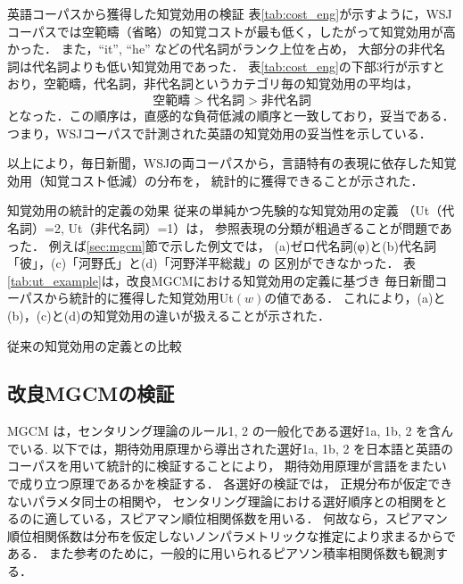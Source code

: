 \documentclass[japanese]{jnlp_1.3e}
\renewcommand{\paragraph}{}
\begin{document}
\paragraph{英語コーパスから獲得した知覚効用の検証}
表\ref{tab:cost_eng}が示すように，WSJコーパスでは空範疇（省略）の知覚コストが最も低く，したがって知覚効用が高かった．
また，``it'', ``he'' などの代名詞がランク上位を占め，
大部分の非代名詞は代名詞よりも低い知覚効用であった．
表\ref{tab:cost_eng}の下部3行が示すとおり，空範疇，代名詞，非代名詞というカテゴリ毎の知覚効用の平均は，
\[
 \text{空範疇} > \text{代名詞} > \text{非代名詞}
\]
となった．この順序は，直感的な負荷低減の順序と一致しており，妥当である．
つまり，WSJコーパスで計測された英語の知覚効用の妥当性を示している．

\vspace{\baselineskip}
以上により，毎日新聞，WSJの両コーパスから，言語特有の表現に依存した知覚効用（知覚コスト低減）の分布を，
統計的に獲得できることが示された．



\paragraph{知覚効用の統計的定義の効果}
従来の単純かつ先験的な知覚効用の定義
（Ut（代名詞）=2, Ut（非代名詞）=1）は，
参照表現の分類が粗過ぎることが問題であった．
例えば\ref{sec:mgcm}節で示した例文では，
(a)ゼロ代名詞(φ)と(b)代名詞「彼」，(c)「河野氏」と(d)「河野洋平総裁」の
区別ができなかった．
表\ref{tab:ut_example}は，改良MGCMにおける知覚効用の定義に基づき
毎日新聞コーパスから統計的に獲得した知覚効用Ut$(w)$の値である．
これにより，(a)と(b)，(c)と(d)の知覚効用の違いが扱えることが示された．

\begin{table}[t]
\caption{従来の知覚効用の定義との比較}
\label{tab:ut_example}

\end{table}



\subsection{改良MGCMの検証}
\label{sec:verify_coherence}
MGCM は，センタリング理論のルール1, 2 の一般化である選好1a, 1b, 2 を含んでいる. 
以下では，期待効用原理から導出された選好1a, 1b, 2 を日本語と英語のコーパスを用いて統計的に検証することにより，
期待効用原理が言語をまたいで成り立つ原理であるかを検証する．
各選好の検証では，
正規分布が仮定できないパラメタ同士の相関や，
センタリング理論における選好順序との相関をとるのに適している，スピアマン順位相関係数を用いる．
何故なら，スピアマン順位相関係数は分布を仮定しないノンパラメトリックな推定により求まるからである．
また参考のために，一般的に用いられるピアソン積率相関係数も観測する．
\end{document}

